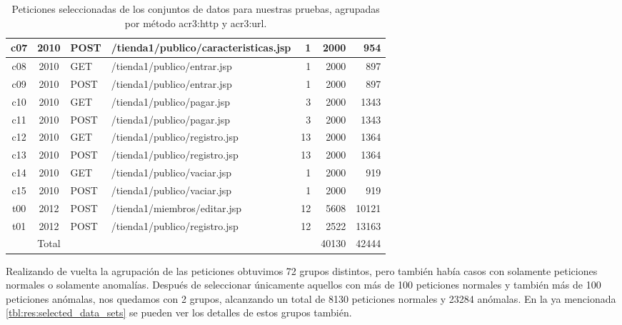 \begin{table}[ht]
\begin{tabularx}{\linewidth}{|C|c|ll|r|r|r|}
        c07 & 2010  & POST & /tienda1/publico/caracteristicas.jsp &  1 &  \num{2000} &   \num{954} \\ \hline
        c08 & 2010  & GET  & /tienda1/publico/entrar.jsp          &  1 &  \num{2000} &   \num{897} \\ \hline
        c09 & 2010  & POST & /tienda1/publico/entrar.jsp          &  1 &  \num{2000} &   \num{897} \\ \hline
        c10 & 2010  & GET  & /tienda1/publico/pagar.jsp           &  3 &  \num{2000} &  \num{1343} \\ \hline
        c11 & 2010  & POST & /tienda1/publico/pagar.jsp           &  3 &  \num{2000} &  \num{1343} \\ \hline
        c12 & 2010  & GET  & /tienda1/publico/registro.jsp        & 13 &  \num{2000} &  \num{1364} \\ \hline
        c13 & 2010  & POST & /tienda1/publico/registro.jsp        & 13 &  \num{2000} &  \num{1364} \\ \hline
        c14 & 2010  & GET  & /tienda1/publico/vaciar.jsp          &  1 &  \num{2000} &   \num{919} \\ \hline
        c15 & 2010  & POST & /tienda1/publico/vaciar.jsp          &  1 &  \num{2000} &   \num{919} \\ \hline
        t00 & 2012  & POST & /tienda1/miembros/editar.jsp         & 12 &  \num{5608} & \num{10121} \\ \hline
        t01 & 2012  & POST & /tienda1/publico/registro.jsp        & 12 &  \num{2522} & \num{13163} \\
            & Total &      &                                      &    & \num{40130} & \num{42444} \\ \hline
    \end{tabularx}

    \caption{Peticiones seleccionadas de los conjuntos de datos para nuestras
        pruebas, agrupadas por método \gls{acr3:http} y \gls{acr3:url}.}
    \label{tbl:res:selected_data_sets}
\end{table}

Realizando de vuelta la agrupación de las peticiones obtuvimos 72 grupos
distintos, pero también había casos con solamente peticiones normales
o solamente anomalías. Después de seleccionar únicamente aquellos con
más de 100 peticiones normales y también más de 100 peticiones anómalas,
nos quedamos con 2 grupos, alcanzando un total de \num{8130} peticiones
normales y \num{23284} anómalas.
En la ya mencionada \autoref{tbl:res:selected_data_sets} se pueden ver los
detalles de estos grupos también.


